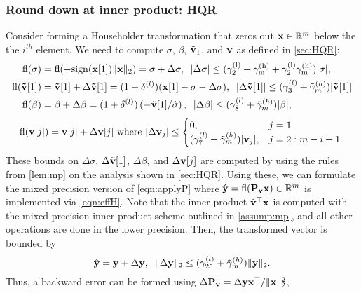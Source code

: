 \subsubsection{Round down at inner product: HQR}
Consider forming a Householder transformation that zeros out $\mathbf{x}\in\mathbb{R}^m$ below the the $i^{th}$ element. 
We need to compute $\sigma$, $\beta$, $\tilde{\mathbf{v}}_1$, and $\mathbf{v}$ as defined in \cref{sec:HQR}:
\begin{align}
\fl(\sigma) &= \rm{fl}(-\rm{sign}(\bb{x}[1])\|\bb{x}\|_2) = \sigma + \Delta \sigma,\;\;|\Delta\sigma| \leq (\gamma_{2}^{(l)}+\gamma_{m}^{(h)}+\gamma_{2}^{(l)}\gamma_{m}^{(h)})|\sigma|,\label{eqn:mpsigma}\\
\fl(\bb{\tilde{v}}[1])& =\bb{\tilde{v}}[1] + \Delta \bb{\tilde{v}}[1] = (1+\dd^{(l)}) (\bb{x}[1]-\sigma-\Delta\sigma), \;\;|\Delta\bb{\tilde{v}}[1]| \leq (\gamma_{3}^{(l)}+\tilde{\gamma}_{m}^{(h)})|\bb{\tilde{v}}[1]| \label{eqn:mpv1}\\
\fl(\beta) &= \beta +\Delta \beta= (1+\dd^{(l)})\left(-\tilde{\bb{v}}[1]/\hat{\sigma}\right), \;\; |\Delta\beta| \leq (\gamma_{8}^{(l)}+\tilde{\gamma}_{m}^{(h)})|\beta|, \label{eqn:mpbeta}
\end{align}
\begin{equation}
	\fl(\bb{v}[j])	= \bb{v}[j] + \Delta \bb{v}[j]\text{ where }|\Delta \bb{v}_j|\leq 
	\begin{cases}
	0,& j=1\\
	(\gamma_{7}^{(l)} + \tilde{\gamma}_{m}^{(h)})|\bb{v}_j|,&j=2:m-i+1.
	\end{cases}  \label{eqn:mpv}
\end{equation}
These bounds on $\Delta\sigma$, $\Delta \mathbf{\tilde{v}}[1]$, $\Delta \beta$, and $\Delta \mathbf{v}[j]$ are computed by using the rules from \cref{lem:mp} on the analysis shown in \cref{sec:HQR}.
Using these, we can formulate the mixed precision version of \cref{eqn:applyP} where $\hat{\mathbf{y}}=\mathrm{fl}(\mathbf{P_vx})\in\mathbb{R}^m$ is implemented via \cref{eqn:effH}.
Note that the inner product $\hat{\mathbf{v}}^{\top}\mathbf{x}$ is computed with the mixed precision inner product scheme outlined in \cref{assump:mp}, and all other operations are done in the lower precision.
Then, the transformed vector is bounded by
\begin{equation}
	\hat{\bb{y}} = \bb{y}+\Delta \bb{y},\;\; \|\Delta \bb{y}\|_2 \leq (\gamma_{25}^{(l)} + \tilde{\gamma}_{m}^{(h)})\|\bb{y}\|_2.\label{eqn:mpdelty}
\end{equation}
Thus, a backward error can be formed using $\Delta \mathbf{P_v} = \Delta \mathbf{y}\mathbf{x}^{
\top}/\|\mathbf{x}\|_2^2$,
